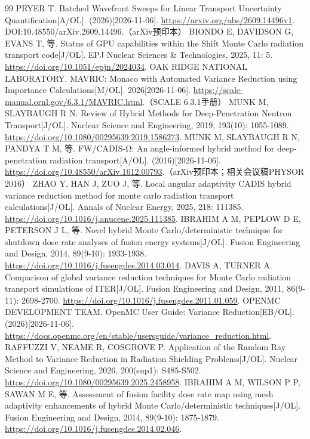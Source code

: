 \documentclass[UTF8, zihao=-4, fontset=none, a4paper]{ctexart}
\begin{document}
\begin{thebibliography}{99}
 PRYER T. Batched Wavefront Sweeps for Linear Transport Uncertainty Quantification{[}A/OL{]}. (2026)[2026-11-06]. \url{https://arxiv.org/abs/2609.14496v1}. DOI:10.48550/arXiv.2609.14496.（arXiv预印本）
 BIONDO E, DAVIDSON G, EVANS T, 等. Status of GPU capabilities within the Shift Monte Carlo radiation transport code{[}J/OL{]}. EPJ Nuclear Sciences \& Technologies, 2025, 11: 5. \url{https://doi.org/10.1051/epjn/2024034}.
 OAK RIDGE NATIONAL LABORATORY. MAVRIC: Monaco with Automated Variance Reduction using Importance Calculations{[}M/OL{]}. 2026[2026-11-06]. \url{https://scale-manual.ornl.gov/6.3.1/MAVRIC.html}.（SCALE 6.3.1手册）
 MUNK M, SLAYBAUGH R N. Review of Hybrid Methods for Deep-Penetration Neutron Transport{[}J/OL{]}. Nuclear Science and Engineering, 2019, 193(10): 1055-1089. \url{https://doi.org/10.1080/00295639.2019.1586273}.
 MUNK M, SLAYBAUGH R N, PANDYA T M, 等. FW/CADIS-Ω: An angle-informed hybrid method for deep-penetration radiation transport{[}A/OL{]}. (2016)[2026-11-06]. \url{https://doi.org/10.48550/arXiv.1612.00793}.（arXiv预印本；相关会议稿PHYSOR 2016）
 ZHAO Y, HAN J, ZUO J, 等. Local angular adaptivity CADIS hybrid variance reduction method for monte carlo radiation transport calculations{[}J/OL{]}. Annals of Nuclear Energy, 2025, 218: 111385. \url{https://doi.org/10.1016/j.anucene.2025.111385}.
 IBRAHIM A M, PEPLOW D E, PETERSON J L, 等. Novel hybrid Monte Carlo/deterministic technique for shutdown dose rate analyses of fusion energy systems{[}J/OL{]}. Fusion Engineering and Design, 2014, 89(9-10): 1933-1938. \url{https://doi.org/10.1016/j.fusengdes.2014.03.014}.
 DAVIS A, TURNER A. Comparison of global variance reduction techniques for Monte Carlo radiation transport simulations of ITER{[}J/OL{]}. Fusion Engineering and Design, 2011, 86(9-11): 2698-2700. \url{https://doi.org/10.1016/j.fusengdes.2011.01.059}.
 OPENMC DEVELOPMENT TEAM. OpenMC User Guide: Variance Reduction{[}EB/OL{]}. (2026)[2026-11-06]. \url{https://docs.openmc.org/en/stable/usersguide/variance_reduction.html}.
 RAFFUZZI V, NEAME R, COSGROVE P. Application of the Random Ray Method to Variance Reduction in Radiation Shielding Problems{[}J/OL{]}. Nuclear Science and Engineering, 2026, 200(sup1): S485-S502. \url{https://doi.org/10.1080/00295639.2025.2458958}.
 IBRAHIM A M, WILSON P P, SAWAN M E, 等. Assessment of fusion facility dose rate map using mesh adaptivity enhancements of hybrid Monte Carlo/deterministic techniques{[}J/OL{]}. Fusion Engineering and Design, 2014, 89(9-10): 1875-1879. \url{https://doi.org/10.1016/j.fusengdes.2014.02.046}.

\end{thebibliography}
\end{document}
